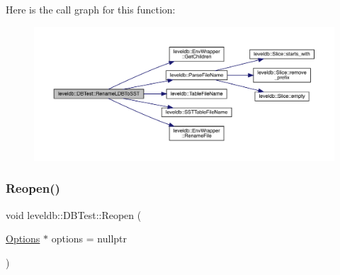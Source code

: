 Here is the call graph for this function\+:
\nopagebreak
\begin{figure}[H]
\begin{center}
\leavevmode
\includegraphics[width=350pt]{classleveldb_1_1_d_b_test_a104ae4b9292787d0cfc9a9fb93cc5fa8_cgraph}
\end{center}
\end{figure}
\mbox{\label{classleveldb_1_1_d_b_test_a09189633fd9c14d487685c3c400b5ccc}} 
\subsubsection{\texorpdfstring{Reopen()}{Reopen()}}
{\footnotesize\ttfamily void leveldb\+::\+D\+B\+Test\+::\+Reopen (\begin{DoxyParamCaption}\item[{\mbox{\hyperlink{structleveldb_1_1_options}{Options}} $\ast$}]{options = {\ttfamily nullptr} }\end{DoxyParamCaption})\hspace{0.3cm}{\ttfamily [inline]}}

